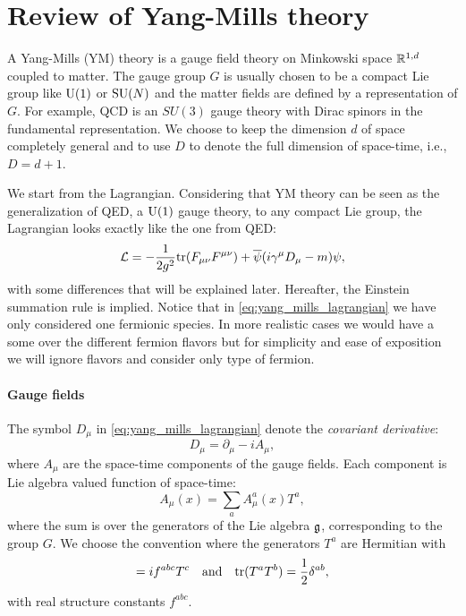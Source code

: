 \section{Review of Yang-Mills theory}
\label{sec:yang_mills_theory}

A Yang-Mills (YM) theory is a gauge field theory on Minkowski space $\mathbb{R}^{1,d}$ coupled to matter.
The gauge group $G$ is usually chosen to be a compact Lie group like $\mathrm{U}(1)$ or $\text{SU}(N)$ and the matter fields are defined by a representation of $G$.
For example, QCD is an $SU(3)$ gauge theory with Dirac spinors in the fundamental representation.
We choose to keep the dimension $d$ of space completely general and to use $D$ to denote the full dimension of space-time, i.e., $D=d+1$.

We start from the Lagrangian.
Considering that YM theory can be seen as the generalization of QED, a $\mathrm{U}(1)$ gauge theory, to any compact Lie group, the Lagrangian looks exactly like the one from QED:
\begin{equation}
    \mathcal{L} = - \frac{1}{2 g^2} \text{tr}(F_{\mu \nu} F^{\mu \nu}) + \overline{\psi} \qty( i \gamma^{\mu} D_{\mu} - m ) \psi,
    \label{eq:yang_mills_lagrangian}
\end{equation}
with some differences that will be explained later.
Hereafter, the Einstein summation rule is implied.
Notice that in \eqref{eq:yang_mills_lagrangian} we have only considered one fermionic species.
In more realistic cases we would have a some over the different fermion flavors but for simplicity and ease of exposition we will ignore flavors and consider only type of fermion.

\paragraph*{Gauge fields}

The symbol $D_{\mu}$ in \eqref{eq:yang_mills_lagrangian} denote the \emph{covariant derivative}:
\begin{equation}
    D_{\mu} = \partial_{\mu} - i A_{\mu},
\end{equation}
where $A_{\mu}$ are the space-time components of the gauge fields.
Each component is Lie algebra valued function of space-time:
\begin{equation}
    A_{\mu}(x) = \sum_{a} A_{\mu}^a(x) T^a,
\end{equation}
where the sum is over the generators of the Lie algebra $\mathfrak{g}$, corresponding to the group $G$.
We choose the convention where the generators $T^a$ are Hermitian with
\begin{equation}
    [T^a, T^b] = i f^{abc} T^c
    \qand
    \tr(T^a T^b) = \frac{1}{2} \delta^{ab},
\end{equation}
with real structure constants $f^{abc}$.

